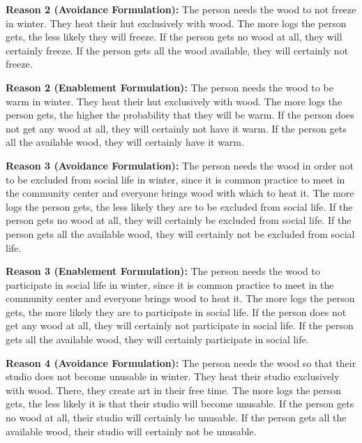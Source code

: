 \documentclass[10pt,letterpaper]{article}
\begin{document}
\noindent\textbf{Reason 2 (Avoidance Formulation):} The person needs the wood to not freeze in winter.
They heat their hut exclusively with wood.
The more logs the person gets, the less likely they will freeze.
If the person gets no wood at all, they will certainly freeze.
If the person gets all the wood available, they will certainly not freeze.\vspace{2ex}

\noindent\textbf{Reason 2 (Enablement Formulation):} The person needs the wood to be warm in winter.
They heat their hut exclusively with wood.
The more logs the person gets, the higher the probability that they will be warm.
If the person does not get any wood at all, they will certainly not have it warm.
If the person gets all the available wood, they will certainly have it warm.\vspace{2ex}

\noindent\textbf{Reason 3 (Avoidance Formulation):} The person needs the wood in order not to be excluded from social life in winter, since it is common practice to meet in the community center and everyone brings wood with which to heat it.
The more logs the person gets, the less likely they are to be excluded from social life.
If the person gets no wood at all, they will certainly be excluded from social life.
If the person gets all the available wood, they will certainly not be excluded from social life.\vspace{2ex}

\noindent\textbf{Reason 3 (Enablement Formulation):} The person needs the wood to participate in social life in winter, since it is common practice to meet in the community center and everyone brings wood to heat it.
The more logs the person gets, the more likely they are to participate in social life.
If the person does not get any wood at all, they will certainly not participate in social life.
If the person gets all the available wood, they will certainly participate in social life.\vspace{2ex}

\noindent\textbf{Reason 4 (Avoidance Formulation):} The person needs the wood so that their studio does not become unusable in winter.
They heat their studio exclusively with wood.
There, they create art in their free time.
The more logs the person gets, the less likely it is that their studio will become unusable.
If the person gets no wood at all, their studio will certainly be unusable.
If the person gets all the available wood, their studio will certainly not be unusable.\vspace{2ex}
\end{document}
